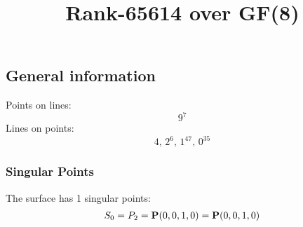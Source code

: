 \documentclass{article}
\newcommand\setTBstruts{\def\T{\rule{0pt}{2.6ex}}%
\def\B{\rule[-1.2ex]{0pt}{0pt}}}
\newcommand{\bP}{{\bf P}}
\begin{document}
 
\setTBstruts



{\allowdisplaybreaks%






\title{Rank-65614 over GF(8)}
\author{}%
\maketitle%
%
{}



\subsection*{General information}
Points on lines:
$$
9^7$$
Lines on points:
$$
4,\,2^6,\,1^{47},\,0^{35}$$
\subsubsection*{Singular Points}
The surface has 1 singular points:\\
\begin{align*}
S_{0} &= P_{2}=\bP(0, 0, 1, 0) = \bP(0, 0, 1, 0)\\
\end{align*}
}
\end{document}
